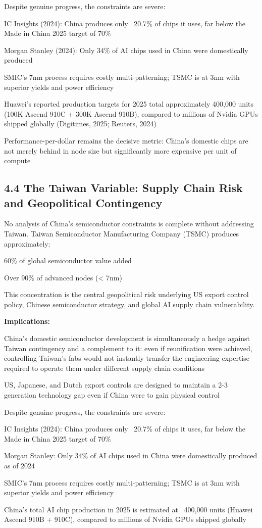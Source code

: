\documentclass[11pt,a4paper]{article}
\begin{document}
Despite genuine progress, the constraints are severe:
\item IC Insights (2024): China produces only ~20.7\% of chips it uses, far below the Made in China 2025 target of 70\%
\item Morgan Stanley (2024): Only 34\% of AI chips used in China were domestically produced
\item SMIC's 7nm process requires costly multi-patterning; TSMC is at 3nm with superior yields and power efficiency
\item Huawei's reported production targets for 2025 total approximately 400,000 units (100K Ascend 910C + 300K Ascend 910B), compared to millions of Nvidia GPUs shipped globally (Digitimes, 2025; Reuters, 2024)
\item Performance-per-dollar remains the decisive metric: China's domestic chips are not merely behind in node size but significantly more expensive per unit of compute

\subsection{4.4 The Taiwan Variable: Supply Chain Risk and Geopolitical Contingency}

No analysis of China's semiconductor constraints is complete without addressing Taiwan. Taiwan Semiconductor Manufacturing Company (TSMC) produces approximately:
\item 60\% of global semiconductor value added
\item Over 90\% of advanced nodes (< 7nm)

This concentration is the central geopolitical risk underlying US export control policy, Chinese semiconductor strategy, and global AI supply chain vulnerability.

\textbf{Implications:}
\item China's domestic semiconductor development is simultaneously a hedge against Taiwan contingency and a complement to it: even if reunification were achieved, controlling Taiwan's fabs would not instantly transfer the engineering expertise required to operate them under different supply chain conditions
\item US, Japanese, and Dutch export controls are designed to maintain a 2-3 generation technology gap even if China were to gain physical control



Despite genuine progress, the constraints are severe:
\item IC Insights (2024): China produces only ~20.7\% of chips it uses, far below the Made in China 2025 target of 70\%
\item Morgan Stanley: Only 34\% of AI chips used in China were domestically produced as of 2024
\item SMIC's 7nm process requires costly multi-patterning; TSMC is at 3nm with superior yields and power efficiency
\item China's total AI chip production in 2025 is estimated at ~400,000 units (Huawei Ascend 910B + 910C), compared to millions of Nvidia GPUs shipped globally
\end{document}

